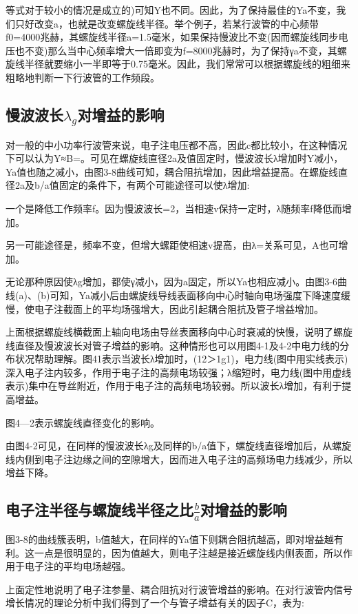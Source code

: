	
	等式对于较小的情况是成立的)可知Y也不同。因此，为了保持最佳的Ya不变，我们只好改变a，也就是改变螺旋线半径。举个例子，若某行波管的中心频带f0=4000兆赫，其螺旋线半径a=1.5毫米，如果保持慢波比不变(因而螺旋线同步电压也不变)那么当中心频率增大一倍即变为f=8000兆赫时，为了保持γa不变，其螺旋线半径就要缩小一半即等于0.75毫米。因此，我们常常可以根据螺旋线的粗细来粗略地判断一下行波管的工作频段。


\subsection{慢波波长$ \lambda_g $对增益的影响}
 对一般的中小功率行波管来说，电子注电压都不高，因此c都比较小，在这种情况下可以认为Y≈B=。可见在螺旋线直径2a及值固定时，慢波波长λ增加时Y减小，Ya值也随之减小，由图3-8曲线可知，耦合阻抗增加，因此增益提高。在螺旋线直径2a及b/a值固定的条件下，有两个可能途径可以使λ增加:

 
 一个是降低工作频率f。因为慢波波长=2，当相速v保持一定时，λ随频率f降低而增加。

 
 另一可能途径是，频率不变，但增大螺距使相速v提高，由λ=关系可见，A也可增加。

 
 无论那种原因使λg增加，都使γ减小，因为a固定，所以Ya也相应减小。由图3-6曲线(a)、(b)可知，Ya减小后由螺旋线导线表面移向中心时轴向电场强度下降速度缓慢，使电子注截面上的平均场强增大，因此引起耦合阻抗及管子增益增加。

 
 上面根据螺旋线横截面上轴向电场由导丝表面移向中心时衰减的快慢，说明了螺旋线直径及慢波波长对管子增益的影响。这种情形也可以用图4-1及4-2中电力线的分布状况帮助理解。图41表示当波长λ增加时，(12＞1g1)，电力线(图中用实线表示)深入电子注内较多，作用于电子注的高频电场较强；λ缩短时，电力线(图中用虚线表示)集中在导丝附近，作用于电子注的高频电场较弱。所以波长λ增加，有利于提高增益。

 
 图4—2表示螺旋线直径变化的影响。

 
 由图4-2可见，在同样的慢波波长λg及同样的b/a值下，螺旋线直径增加后，从螺旋线内侧到电子注边缘之间的空隙增大，因而进入电子注的高频场电力线减少，所以增益下降。


\subsection{电子注半径与螺旋线半径之比$ \frac{b}{a} $对增益的影响}
 图3-8的曲线簇表明，b值越大，在同样的Ya值下则耦合阻抗越高，即对增益越有利。这一点是很明显的，因为值越大，则电子注越是接近螺旋线内侧表面，所以作用于电子注的平均电场越强。

 
 上面定性地说明了电子注参量、耦合阻抗对行波管增益的影响。在对行波管内信号增长情况的理论分析中我们得到了一个与管子增益有关的因子C，表为:

